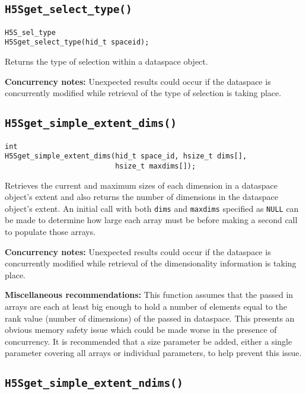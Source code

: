 \documentclass[../HDF5_RFC.tex]{subfiles}
\begin{document}
\subsection{\texttt{H5Sget\_select\_type()}}
\label{apdx:h5s_func_h5sget_select_type}

\begin{verbatim}
H5S_sel_type
H5Sget_select_type(hid_t spaceid);
\end{verbatim}

Returns the type of selection within a dataspace object.

\textbf{Concurrency notes:} Unexpected results could occur if the dataspace is concurrently
modified while retrieval of the type of selection is taking place.

\subsection{\texttt{H5Sget\_simple\_extent\_dims()}}
\label{apdx:h5s_func_h5sget_simple_extent_dims}

\begin{verbatim}
int
H5Sget_simple_extent_dims(hid_t space_id, hsize_t dims[],
                          hsize_t maxdims[]);
\end{verbatim}

Retrieves the current and maximum sizes of each dimension in a dataspace object's extent and also
returns the number of dimensions in the dataspace object's extent. An initial call with both
\texttt{dims} and \texttt{maxdims} specified as \texttt{NULL} can be made to determine how large
each array must be before making a second call to populate those arrays.

\textbf{Concurrency notes:} Unexpected results could occur if the dataspace is concurrently modified
while retrieval of the dimensionality information is taking place.

\textbf{Miscellaneous recommendations:} This function assumes that the passed in arrays are
each at least big enough to hold a number of elements equal to the rank value (number of
dimensions) of the passed in dataspace. This presents an obvious memory safety issue which
could be made worse in the presence of concurrency. It is recommended that a size parameter
be added, either a single parameter covering all arrays or individual parameters, to help
prevent this issue.

\subsection{\texttt{H5Sget\_simple\_extent\_ndims()}}
\label{apdx:h5s_func_h5sget_simple_extent_ndims}
\end{document}
